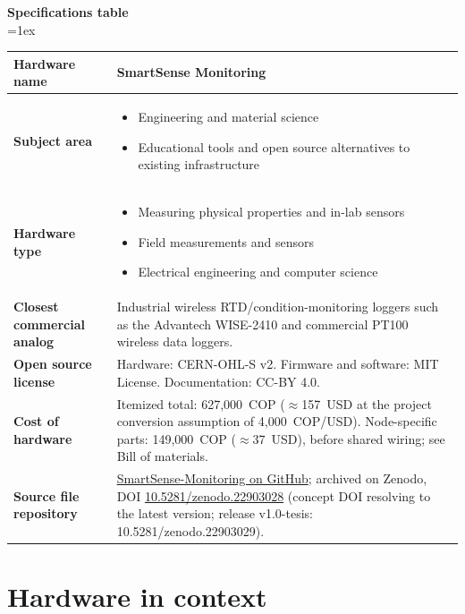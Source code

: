 \documentclass[11pt, letterpaper]{article}
\begin{document}
\begin{flushleft}
\newpage
\textbf{Specifications table}\\
\vskip 0.2cm
\tabulinesep=1ex
\begin{tabu} to \linewidth {|X[l]|X[3,l]|}
\hline \textbf{Hardware name} & SmartSense Monitoring \\
\hline \textbf{Subject area} &
  \begin{itemize}[noitemsep, topsep=0pt]
  \item Engineering and material science
  \item Educational tools and open source alternatives to existing infrastructure
  \end{itemize} \\
\hline \textbf{Hardware type} &
  \begin{itemize}[noitemsep, topsep=0pt]
  \item Measuring physical properties and in-lab sensors
  \item Field measurements and sensors
  \item Electrical engineering and computer science
  \end{itemize} \\
\hline \textbf{Closest commercial analog} & Industrial wireless RTD/condition-monitoring loggers such as the Advantech WISE-2410 and commercial PT100 wireless data loggers. \\
\hline \textbf{Open source license} & Hardware: CERN-OHL-S v2. Firmware and software: MIT License. Documentation: CC-BY 4.0. \\
\hline \textbf{Cost of hardware} & Itemized total: 627{,}000~COP ($\approx$157~USD at the project conversion assumption of 4{,}000~COP/USD). Node-specific parts: 149{,}000~COP ($\approx$37~USD), before shared wiring; see Bill of materials. \\
\hline \textbf{Source file repository} & \href{https://github.com/DavidSPuentesc/SmartSense-Monitoring}{SmartSense-Monitoring on GitHub}; archived on Zenodo, DOI \href{https://doi.org/10.5281/zenodo.22903028}{10.5281/zenodo.22903028} (concept DOI resolving to the latest version; release v1.0-tesis: 10.5281/zenodo.22903029). \\
\hline
\end{tabu}
\end{flushleft}

\newpage
\section{Hardware in context}
\end{document}
